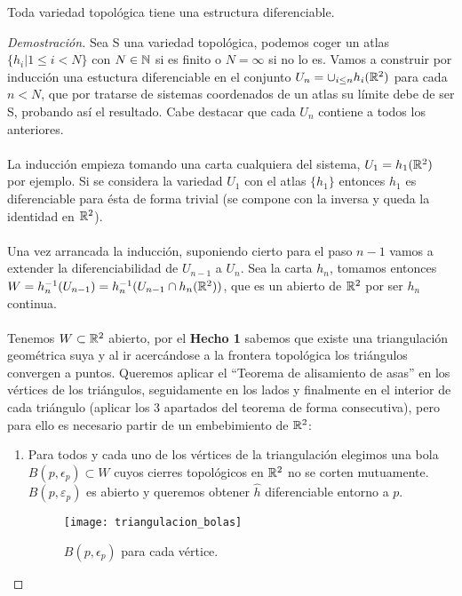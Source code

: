 	\begin{teora}
		Toda variedad topológica tiene una estructura diferenciable.
	\end{teora}
	\begin{proof}[Demostración]
		Sea S una variedad topológica, podemos coger un atlas $\{h_i | 1\leq i < N\}$ con $N \in \mathbb{N}$ si es finito o $N = \infty$ si no lo es. Vamos a construir por inducción una estuctura diferenciable en el conjunto $U_n = \cup_{i\leq n}h_i(\mathbb{R}^2)$ para cada $n < N$, que por tratarse de sistemas coordenados de un atlas su límite debe de ser S, probando así el resultado. Cabe destacar que cada $U_n$ contiene a todos los anteriores. \\
		\\ La inducción empieza tomando una carta cualquiera del sistema, $U_1=h_1(\mathbb{R}^2)$ por ejemplo. Si se considera la variedad $U_1$ con el atlas $\{h_1\}$ entonces $h_1$ es diferenciable para ésta de forma trivial (se compone con la inversa y queda la identidad en $\mathbb{R}^2$).\\
		\\ Una vez arrancada la inducción, suponiendo cierto para el paso $n-1$ vamos a extender la diferenciabilidad de $U_{n-1}$ a $U_n$. Sea la carta $h_n$, tomamos entonces $W=h_n^{-1}(U_{n-1})=h_n^{-1}(U_{n-1}\cap h_n(\mathbb{R}^2))$, que es un abierto de $\mathbb{R}^2$ por ser $h_n$ continua. \\
		\\ Tenemos $W\subset \mathbb{R}^2$ abierto, por el \textbf{Hecho 1} sabemos que existe una triangulación geométrica suya y al ir acercándose a la frontera topológica los triángulos convergen a puntos. Queremos aplicar el ``Teorema de alisamiento de asas'' en los vértices de los triángulos, seguidamente en los lados y finalmente en el interior de cada triángulo (aplicar los 3 apartados del teorema de forma consecutiva), pero para ello es necesario partir de un embebimiento de $\mathbb{R}^2$:
		\begin{enumerate}
			\item Para todos y cada uno de los vértices de la triangulación elegimos una bola $B(p, \epsilon_p) \subset W$ cuyos cierres topológicos en $\mathbb{R}^2$ no se corten mutuamente. $B(p,\varepsilon _p)$ es abierto y queremos obtener $\widehat{h}$ diferenciable entorno a $p$. \\
			\newpage
			\begin{figure}[h]
  				\centering
  				\texttt{[image: triangulacion\_bolas]}
  				\caption{$B(p, \epsilon_p)$ para cada vértice.}
  				\label{fig:triangulacion_bolas}

\end{figure}
\end{enumerate}
\end{proof}
